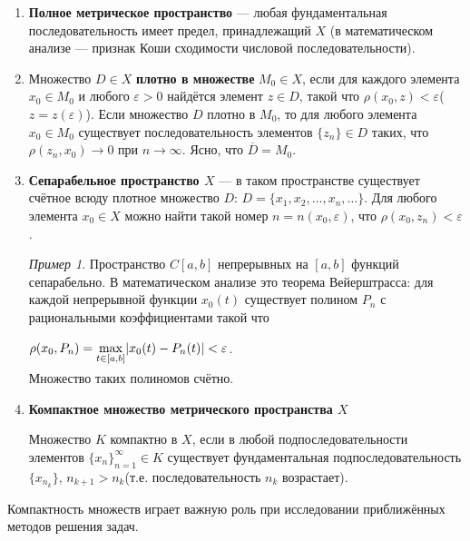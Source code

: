 \documentclass[12pt,a4paper,titlepage]{book}
\theoremstyle{definition}
\theoremstyle{plain}
\theoremstyle{remark}
\theoremstyle{remark}
\newtheorem*{example}{Пример}
\theoremstyle{remark}
\theoremstyle{plain}
\begin{document}
\begin{enumerate}

	\item \textbf{Полное метрическое пространство} --- любая фундаментальная последовательность имеет предел, принадлежащий $X$ (в математическом анализе --- признак Коши сходимости числовой последовательности).

	\item Множество $D\in X$ \textbf{плотно в множестве} $ M_0 \in X$, если для каждого элемента $x_0 \in M_0$ и любого $\varepsilon>0$ найдётся элемент $z \in D$, такой что $\rho(x_0, z)<\varepsilon$($z=z(\varepsilon)$). Если множество $D$ плотно в $M_0$, то для любого элемента $x_0\in M_0$ существует последовательность элементов $\lbrace z_n \rbrace \in D$ таких, что $\rho(z_n, x_0)\rightarrow0$ при $n\rightarrow\infty$. Ясно, что $\overline{D}=M_0$.

	\item \textbf{Сепарабельное пространство $X$} --- в таком пространстве существует счётное всюду плотное множество $D$: $D=\lbrace x_1,x_2,\ldots,x_n,\ldots \rbrace$. Для любого элемента $x_0 \in X$ можно найти такой номер $n=n(x_0,\varepsilon)$, что $\rho(x_0, z_n)<\varepsilon$.

	\begin{example}	
	Пространство $C[a,b]$ непрерывных на $[a,b]$ функций сепарабельно. В математическом анализе это теорема Вейерштрасса: для каждой непрерывной функции $x_0(t)$ существует полином $P_n$ с рациональными коэффициентами такой что
	\end{example}
	
	\begin{center}
	$\rho(x_0, P_n)=\smash{\displaystyle\max_{t \in [a,b]}} |x_0(t)-P_n(t)| <\varepsilon$.
	\end{center}
	
	Множество таких полиномов счётно.
	
	\item \textbf{Компактное множество метрического пространства $X$}

	Множество $K$ компактно в $X$, если в любой подпоследовательности элементов $\lbrace x_n \rbrace_{n=1}^{\infty} \in K$ существует фундаментальная подпоследовательность $\lbrace x_{n_k} \rbrace$, $n_{k+1}>n_k$(т.е. последовательность $n_k$ возрастает).

\end{enumerate}


Компактность множеств играет важную роль при исследовании приближённых методов решения задач.
\end{document}
